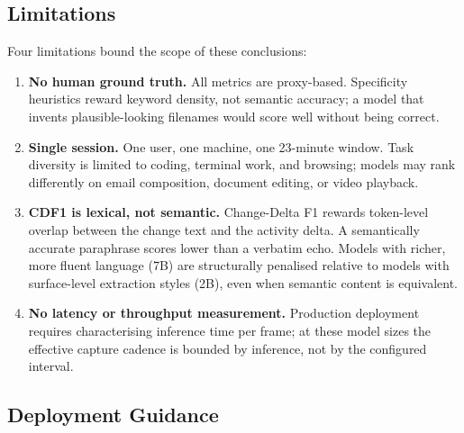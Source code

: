 \documentclass[10pt, twocolumn]{article}
\begin{document}
\subsection{Limitations}

Four limitations bound the scope of these conclusions:
\begin{enumerate}
  \item \textbf{No human ground truth.} All metrics are proxy-based. Specificity
        heuristics reward keyword density, not semantic accuracy; a model that
        invents plausible-looking filenames would score well without being correct.
  \item \textbf{Single session.} One user, one machine, one 23-minute window.
        Task diversity is limited to coding, terminal work, and browsing; models
        may rank differently on email composition, document editing, or video
        playback.
  \item \textbf{CDF1 is lexical, not semantic.} Change-Delta F1 rewards token-level
        overlap between the change text and the activity delta. A semantically
        accurate paraphrase scores lower than a verbatim echo. Models with richer,
        more fluent language (7B) are structurally penalised relative to models with
        surface-level extraction styles (2B), even when semantic content is equivalent.
  \item \textbf{No latency or throughput measurement.} Production deployment
        requires characterising inference time per frame; at these model sizes the
        effective capture cadence is bounded by inference, not by the configured
        interval.
\end{enumerate}

\subsection{Deployment Guidance}
\end{document}
